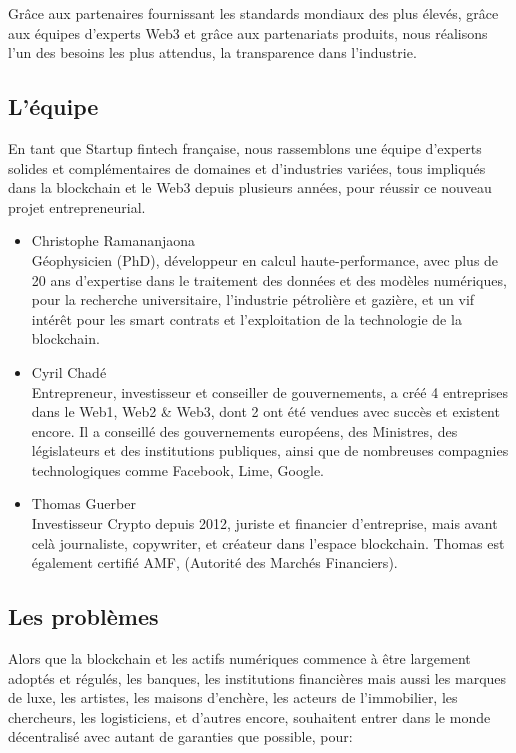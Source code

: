 ﻿\documentclass[a4paper]{article}
\newcommand{\smallvspace}{\vspace{4pt} \\}
\begin{document}
Grâce aux partenaires fournissant les standards mondiaux des plus élevés, grâce aux équipes d’experts Web3 et grâce aux partenariats produits, nous réalisons l’un des besoins les plus attendus, la transparence dans l’industrie.
\subsection{L’équipe}
En tant que Startup fintech française, nous rassemblons une équipe d’experts solides et complémentaires de domaines et d’industries variées, tous impliqués dans la blockchain et le Web3 depuis plusieurs années, pour réussir ce nouveau projet entrepreneurial.

\begin{itemize}
\item 
Christophe Ramananjaona \smallvspace
Géophysicien (PhD), développeur en calcul haute-performance, avec plus de 20 ans d’expertise dans le traitement des données et des modèles numériques, pour la recherche universitaire, l’industrie pétrolière et gazière, et un vif intérêt pour les smart contrats et l’exploitation de la technologie de la blockchain.

\item 
Cyril Chadé \smallvspace
Entrepreneur, investisseur et conseiller de gouvernements, a créé 4 entreprises dans le Web1, Web2 \& Web3, dont 2 ont été vendues avec succès et existent encore. Il a conseillé des gouvernements européens, des Ministres, des législateurs et des institutions publiques, ainsi que de nombreuses compagnies technologiques comme Facebook, Lime, Google.

\item 
Thomas Guerber \smallvspace
Investisseur Crypto depuis 2012, juriste et financier d’entreprise, mais avant celà journaliste, copywriter, et créateur dans l’espace blockchain. Thomas est également certifié AMF, (Autorité des Marchés Financiers).
\end{itemize}

\subsection{Les problèmes}
Alors que la blockchain et les actifs numériques commence à être largement adoptés et régulés, les banques, les institutions financières mais aussi les marques de luxe, les artistes, les maisons d’enchère, les acteurs de l’immobilier, les chercheurs, les logisticiens, et d’autres encore, souhaitent entrer dans le monde décentralisé avec autant de garanties que possible, pour: 
\end{document}
